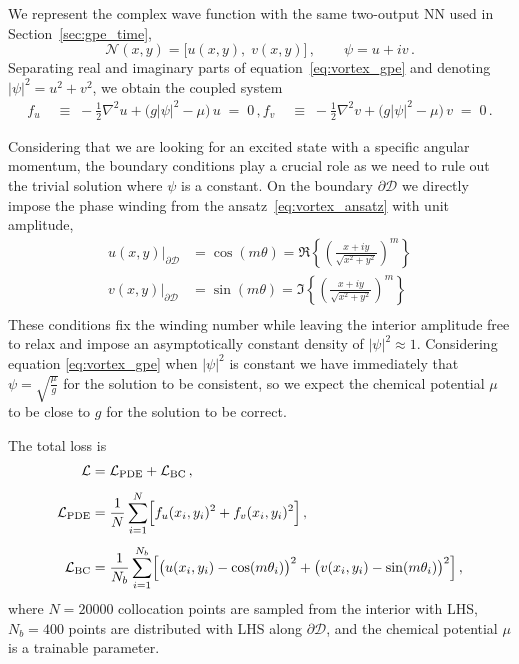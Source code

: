 \documentclass[a4paper, titlepage]{article}
\begin{document}
We represent the complex wave function with the same two-output NN used in
Section~\ref{sec:gpe_time},
\begin{equation*}
    \mathcal{N}(x,y) = \bigl[u(x,y),\;v(x,y)\bigr]\,,
    \qquad \psi = u + iv\,.
\end{equation*}
Separating real and imaginary parts of equation~\eqref{eq:vortex_gpe}
and denoting $|\psi|^2 = u^2 + v^2$, we obtain the coupled system
\begin{align*}
    f_u &\;\equiv\;
        -\frac{1}{2}\nabla^2 u
        + \bigl(g|\psi|^2 - \mu\bigr)\,u
        \;=\; 0\,,
    f_v &\;\equiv\;
        -\frac{1}{2}\nabla^2 v
        + \bigl(g|\psi|^2 - \mu\bigr)\,v
        \;=\; 0\,.
\end{align*}

Considering that we are looking for an excited state with a specific angular
momentum, the boundary conditions play a crucial role as we need to rule out
the trivial solution where $\psi$ is a constant.
On the boundary $\partial\mathcal{D}$ we directly impose the phase winding
from the ansatz~\eqref{eq:vortex_ansatz} with unit amplitude,
\begin{align*}
    u(x,y)\big|_{\partial\mathcal{D}} &= \cos(m\theta) 
    = \Re \left\{ \left(\frac{x + iy}{\sqrt{x^2+y^2}} \right)^m \right\} \\
    v(x,y)\big|_{\partial\mathcal{D}} &= \sin(m\theta) 
    = \Im \left\{ \left(\frac{x + iy}{\sqrt{x^2+y^2}} \right)^m \right\}\\
\end{align*}
These conditions fix the winding number while leaving the interior amplitude
free to relax and impose an asymptotically constant density of 
$|\psi|^2 \approx 1$.
Considering equation \eqref{eq:vortex_gpe} when $|\psi|^2$ is constant we have
immediately that $\psi = \sqrt{\frac{\mu}{g}}$ for the solution to be
consistent, so we expect the chemical potential $\mu$ to be close to $g$ for the
solution to be correct.

The total loss is
\begin{align}
    \mathcal{L} &= \mathcal{L}_{\rm PDE} + \mathcal{L}_{\rm BC}\,,
    \label{eq:vortex_loss}\\[4pt]
    \mathcal{L}_{\rm PDE} &= \frac{1}{N}\sum_{i=1}^{N}
        \Bigl[f_u(x_i,y_i)^2 + f_v(x_i,y_i)^2\Bigr]\,,
    \label{eq:vortex_lpde}\\[4pt]
    \mathcal{L}_{\rm BC} &= \frac{1}{N_b}\sum_{i=1}^{N_b}
        \Bigl[\bigl(u(x_i,y_i)-\cos(m\theta_i)\bigr)^2
             +\bigl(v(x_i,y_i)-\sin(m\theta_i)\bigr)^2\Bigr]\,,
    \label{eq:vortex_lbc}
\end{align}
where $N=20000$ collocation points are sampled from the interior with LHS,
$N_b=400$ points are distributed with LHS along $\partial\mathcal{D}$, and the
chemical potential $\mu$ is a trainable parameter.
\end{document}
